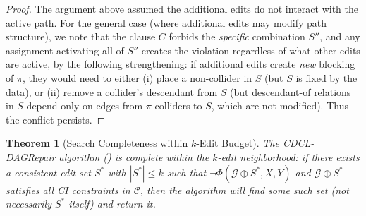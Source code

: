 \documentclass[11pt,a4paper]{article}
\newtheorem{theorem}{Theorem}[section]
\theoremstyle{definition}
\theoremstyle{remark}
\newcommand{\DAG}{\mathcal{G}}
\newcommand{\Phi}{\varPhi}
\begin{document}
\begin{proof}
The argument above assumed the additional edits do not interact with the
active path. For the general case (where additional edits may modify path
structure), we note that the clause $C$ forbids the \emph{specific}
combination $S''$, and any assignment activating all of $S''$ creates the
violation regardless of what other edits are active, by the following
strengthening: if additional edits create \emph{new} blocking
of $\pi$, they would need to either (i) place a non-collider in $S$
(but $S$ is fixed by the data), or (ii) remove a collider's descendant
from $S$ (but descendant-of relations in $S$ depend only on edges
from $\pi$-colliders to $S$, which are not modified). Thus the conflict
persists.
\end{proof}

\begin{theorem}[Search Completeness within $k$-Edit Budget]\label{thm:cdcl_complete}
The CDCL-DAGRepair algorithm () is complete within the $k$-edit
neighborhood: if there exists a consistent edit set $S^*$ with $|S^*| \leq k$
such that $\neg\Phi(\DAG \oplus S^*, X, Y)$ and $\DAG \oplus S^*$ satisfies
all CI constraints in $\mathcal{C}$, then the algorithm will find some such
set (not necessarily $S^*$ itself) and return it.
\end{theorem}
\end{document}
